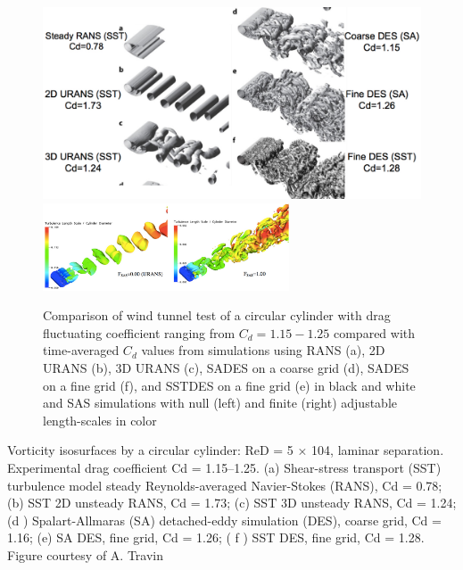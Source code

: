 \documentclass[journal]{new-aiaa}
\begin{document}
\begin{figure}[H]
\begin{center}
\includegraphics[width=1.0\textwidth]{Images/logan/spalart2009detachededdy_cylindersCD.pdf}
\includegraphics[width=0.65\textwidth]{Images/logan/menter2005scaleadaptive_cylinderwake.pdf}
\caption{ Comparison of wind tunnel test of a circular cylinder with drag fluctuating coefficient ranging from $C_d=1.15-1.25$ compared with time-averaged $C_d$ values from simulations using RANS (a), 2D URANS (b), 3D URANS (c), SADES on a coarse grid (d), SADES on a fine grid (f), and SSTDES on a fine grid (e) \cite{spalart2009detachededdy} in black and white and SAS simulations with null (left) and finite (right) adjustable length-scales in color \cite{menter2005scaleadaptive} }
\label{fig:cylinderturbmodels}
\end{center}
\end{figure}


Vorticity isosurfaces by a circular cylinder: ReD = 5 × 104, laminar separation. Experimental drag
coefficient Cd = 1.15–1.25. (a) Shear-stress transport (SST) turbulence model steady Reynolds-averaged
Navier-Stokes (RANS), Cd = 0.78; (b) SST 2D unsteady RANS, Cd = 1.73; (c) SST 3D unsteady RANS,
Cd = 1.24; (d ) Spalart-Allmaras (SA) detached-eddy simulation (DES), coarse grid, Cd = 1.16; (e) SA DES,
fine grid, Cd = 1.26; ( f ) SST DES, fine grid, Cd = 1.28. Figure courtesy of A. Travin
\end{document}
